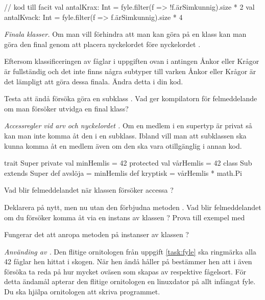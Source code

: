 \begin{Code}
// kod till facit
val antalKrax: Int = fyle.filter(f => !f.ärSimkunnig).size * 2
val antalKvack: Int = fyle.filter(f => f.ärSimkunnig).size * 4
\end{Code}

\Task \emph{Finala klasser.} Om man vill förhindra att man kan göra  på en klass kan man göra den final genom att placera nyckelordet  före nyckelordet .

\Subtask Eftersom klassificeringen av fåglar i uppgiften ovan i antingen Ånkor eller Krågor är fullständig och det inte finns några subtyper till varken Ånkor eller Krågor är det lämpligt att göra dessa finala. Ändra detta i din kod.

\Subtask Testa att ändå försöka göra en subklass . Vad ger kompilatorn för felmeddelande om man försöker utvidga en final klass?   


\Task \emph{Accessregler vid arv och nyckelordet .} Om en medlem i en supertyp är privat så kan man inte komma åt den i en subklass. Ibland vill man att subklassen ska kunna komma åt en medlem även om den ska vara otillgänglig i annan kod. 

\begin{REPL}
trait Super { 
  private val minHemlis = 42
  protected val vårHemlis = 42
}
class Sub extends Super { 
  def avslöja = minHemlis
  def kryptisk = vårHemlis * math.Pi
}
\end{REPL} 
  
\Subtask Vad blir felmeddelandet när klassen  försöker accessa ?

\Subtask Deklarera  på nytt, men nu utan den förbjudna metoden . Vad blir felmeddelandet om du försöker komma åt  via en instans av klassen ? Prova till exempel med 

\Subtask Fungerar det att anropa metoden  på instanser av klassen ?

\Task \emph{Använding av .} Den flitige ornitologen från uppgift \ref{task:fyle} ska ringmärka alla 42 fåglar hen hittat i skogen. När hen ändå håller på bestämmer hen att i även försöka ta reda på hur mycket oväsen som skapas av respektive fågelsort. För detta ändamål apterar den flitige ornitologen en linuxdator på allt infångat fyle. Du ska hjälpa ornitologen att skriva programmet. 

